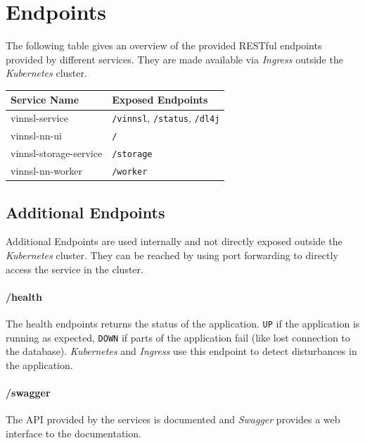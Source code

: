 \section{Endpoints}\label{endpoints}

The following table gives an overview of the provided RESTful endpoints
provided by different services. They are made available via
\emph{Ingress} outside the \emph{Kubernetes} cluster.

\begin{longtable}[]{@{}ll@{}}
\toprule
Service Name & Exposed Endpoints\tabularnewline
\midrule
\endhead
vinnsl-service & \texttt{/vinnsl}, \texttt{/status},
\texttt{/dl4j}\tabularnewline
vinnsl-nn-ui & \texttt{/}\tabularnewline
vinnsl-storage-service & \texttt{/storage}\tabularnewline
vinnsl-nn-worker & \texttt{/worker}\tabularnewline
\bottomrule
\end{longtable}

\subsection{Additional Endpoints}\label{additional-endpoints}

Additional Endpoints are used internally and not directly exposed
outside the \emph{Kubernetes} cluster. They can be reached by using port
forwarding to directly access the service in the cluster.

\paragraph{/health}\label{health}

The health endpoints returns the status of the application. \texttt{UP}
if the application is running as expected, \texttt{DOWN} if parts of the
application fail (like lost connection to the database).
\emph{Kubernetes} and \emph{Ingress} use this endpoint to detect
disturbances in the application.

\paragraph{/swagger}\label{swagger-1}

The API provided by the services is documented and \emph{Swagger}
provides a web interface to the documentation.

\subsubsection{}\label{section-1}

